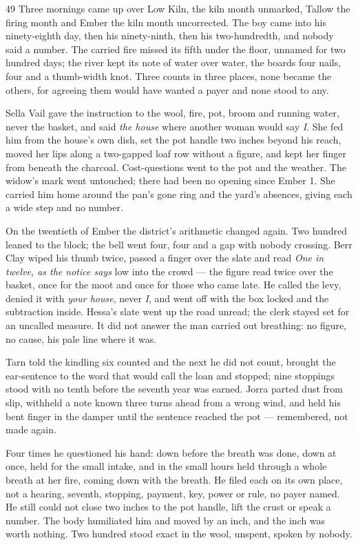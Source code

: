 \begin{CRchronicle}{49}
Three mornings came up over Low Kiln, the kiln month unmarked, Tallow the firing month and Ember the kiln month uncorrected. The boy came into his ninety-eighth day, then his ninety-ninth, then his two-hundredth, and nobody said a number. The carried fire missed its fifth under the floor, unnamed for two hundred days; the river kept its note of water over water, the boards four nails, four and a thumb-width knot. Three counts in three places, none became the others, for agreeing them would have wanted a payer and none stood to any.

Sella Vail gave the instruction to the wool, fire, pot, broom and running water, never the basket, and said \emph{the house} where another woman would say \emph{I}. She fed him from the house’s own dish, set the pot handle two inches beyond his reach, moved her lips along a two-gapped loaf row without a figure, and kept her finger from beneath the charcoal. Cost-questions went to the pot and the weather. The widow’s mark went untouched; there had been no opening since Ember 1. She carried him home around the pan’s gone ring and the yard’s absences, giving each a wide step and no number.

On the twentieth of Ember the district’s arithmetic changed again. Two hundred leaned to the block; the bell went four, four and a gap with nobody crossing. Berr Clay wiped his thumb twice, passed a finger over the slate and read \emph{One in twelve, as the notice says} low into the crowd --- the figure read twice over the basket, once for the moot and once for those who came late. He called the levy, denied it with \emph{your house}, never \emph{I}, and went off with the box locked and the subtraction inside. Hessa’s slate went up the road unread; the clerk stayed set for an uncalled measure. It did not answer the man carried out breathing: no figure, no cause, his pale line where it was.

Tarn told the kindling six counted and the next he did not count, brought the ear-sentence to the word that would call the loan and stopped; nine stoppings stood with no tenth before the seventh year was earned. Jorra parted dust from slip, withheld a note known three turns ahead from a wrong wind, and held his bent finger in the damper until the sentence reached the pot --- remembered, not made again.

Four times he questioned his hand: down before the breath was done, down at once, held for the small intake, and in the small hours held through a whole breath at her fire, coming down with the breath. He filed each on its own place, not a hearing, seventh, stopping, payment, key, power or rule, no payer named. He still could not close two inches to the pot handle, lift the crust or speak a number. The body humiliated him and moved by an inch, and the inch was worth nothing. Two hundred stood exact in the wool, unspent, spoken by nobody.
\end{CRchronicle}
